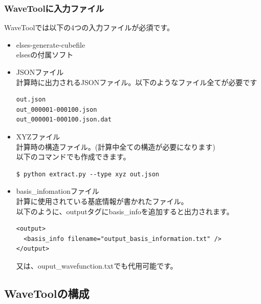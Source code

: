 \documentclass{jsarticle}
\begin{document}
\subsubsection{WaveToolに入力ファイル}
WaveToolでは以下の4つの入力ファイルが必須です。
\begin{itemize}
\item elses-generate-cubefile \\
elsesの付属ソフト\\


\item JSONファイル \\
計算時に出力されるJSONファイル。以下のようなファイル全てが必要です\\
\begin{Verbatim}[frame=single]
out.json
out_000001-000100.json
out_000001-000100.json.dat
\end{Verbatim}

\item XYZファイル\\
計算時の構造ファイル。(計算中全ての構造が必要になります)\\
以下のコマンドでも作成できます。
\begin{Verbatim}[frame=single]
$ python extract.py --type xyz out.json
\end{Verbatim}
\item basis\_infomationファイル\\
計算に使用されている基底情報が書かれたファイル。\\
以下のように、outputタグにbasis\_infoを追加すると出力されます。
\begin{Verbatim}[frame=single]
<output>
  <basis_info filename="output_basis_information.txt" />
</output>
\end{Verbatim}
又は、ouput\_wavefunction.txtでも代用可能です。\\

\end{itemize}

\subsection{WaveToolの構成}
\end{document}
